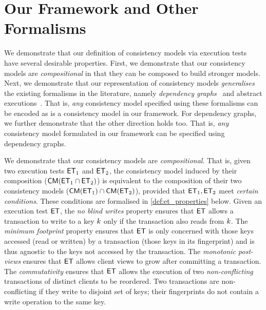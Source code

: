 \section{Our Framework and Other Formalisms}
\label{sec:other_formalisms}
We demonstrate that our definition of consistency models via execution tests have several desirable properties. 
First, we demonstrate that our consistency models are \emph{compositional} in that they can be composed to build stronger models.
Next, we demonstrate that our representation of consistency models \emph{generalises} the existing formalisms in the literature, namely \emph{dependency graphs}~\cite{adya-icde} and abstract executions~\cite{}. 
That is, \emph{any} consistency model specified using these formalisms can be encoded as is a consistency model in our framework. 
For dependency graphs, we further demonstrate that the other direction holds too. 
That is, \emph{any} consistency model formulated in our framework can be specified using dependency graphs. 




We demonstrate that our consistency models are \emph{compositional}.
That is, given two execution tests $\mathsf{ET}_1$ and $\mathsf{ET}_2$, the consistency model induced by their composition 
(\ie $\mathsf{CM}(\mathsf{ET}_1 \cap \mathsf{ET}_2)$) is equivalent to the composition of their two consistency models (\ie $\mathsf{CM}(\mathsf{ET}_1) \cap \mathsf{CM}(\mathsf{ET}_2)$), 
provided that $\mathsf{ET}_1, \mathsf{ET}_2$ meet \emph{certain conditions}.
These conditions are formalised in \cref{def:et_properties} below. 
Given an execution test $\mathsf{ET}$, 
the \emph{no blind writes} property ensures that $\mathsf{ET}$ allows a transaction to write to a key $k$ only if the transaction also reads from $k$. 
The \emph{minimum footprint} property ensures that $\mathsf{ET}$ is only concerned with those keys accessed (read or written) by a transaction (\ie those keys in its fingerprint) and is thus agnostic to the keys not accessed by the transaction. 
The \emph{monotonic post-views} ensures that $\mathsf{ET}$ allows client views to grow after committing a transaction. 
The \emph{commutativity} ensures that $\mathsf{ET}$ allows the execution of two \emph{non-conflicting} transactions of distinct clients to be reordered. 
Two transactions are non-conflicting if they write to disjoint set of keys; \ie their fingerprints do not contain a write operation to the same key. 

